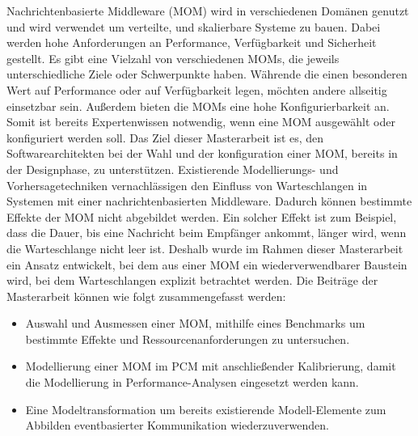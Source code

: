 
\Abstract
Nachrichtenbasierte Middleware (MOM) wird in verschiedenen Domänen genutzt und wird verwendet um verteilte, und skalierbare Systeme zu bauen. Dabei werden hohe Anforderungen an Performance, Verfügbarkeit und Sicherheit gestellt.
Es gibt eine Vielzahl von verschiedenen MOMs, die jeweils unterschiedliche Ziele oder Schwerpunkte haben. Währende die einen besonderen Wert auf Performance oder auf Verfügbarkeit legen, möchten andere allseitig einsetzbar sein. Außerdem bieten die MOMs eine hohe Konfigurierbarkeit an. Somit ist bereits Expertenwissen notwendig, wenn eine MOM ausgewählt oder konfiguriert werden soll. Das Ziel dieser Masterarbeit ist es, den Softwarearchitekten bei der Wahl und der konfiguration einer MOM, bereits in der Designphase, zu unterstützen.
Existierende Modellierungs- und Vorhersagetechniken vernachlässigen den Einfluss von Warteschlangen in Systemen mit einer nachrichtenbasierten Middleware. Dadurch können bestimmte Effekte der MOM nicht abgebildet werden. Ein solcher Effekt ist zum Beispiel, dass die Dauer, bis eine Nachricht beim Empfänger ankommt, länger wird, wenn die Warteschlange nicht leer ist.
Deshalb wurde im Rahmen dieser Masterarbeit ein Ansatz entwickelt, bei dem aus einer MOM ein wiederverwendbarer Baustein wird, bei dem Warteschlangen explizit betrachtet werden. Die Beiträge der Masterarbeit können wie folgt zusammengefasst werden:
\begin{itemize}
    \item Auswahl und Ausmessen einer MOM, mithilfe eines Benchmarks um bestimmte Effekte und Ressourcenanforderungen zu untersuchen.
    \item Modellierung einer MOM im PCM mit anschließender Kalibrierung, damit die Modellierung in Performance-Analysen eingesetzt werden kann.
    \item Eine Modeltransformation um bereits existierende Modell-Elemente zum Abbilden eventbasierter Kommunikation wiederzuverwenden.
\end{itemize}
